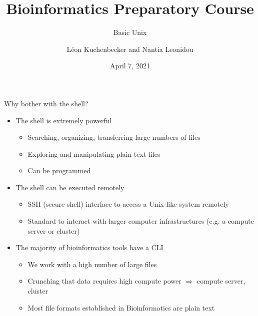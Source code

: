 \documentclass[aspectratio=1610]{beamer}
\title{Bioinformatics Preparatory Course}
\subtitle{Basic Unix}
\author{Léon Kuchenbecker and Nantia Leonidou}
\date{April 7, 2021}
\begin{document}

\begin{frame}
    \titlepage
\end{frame}



\begin{frame}[c]{Why bother with the shell?}
    \begin{itemize}[<+->]\setlength\itemsep{1em}
        \item The shell is extremely powerful

            \begin{itemize}[<.->]
                \item Searching, organizing, transferring large numbers of files
                \item Exploring and manipulating plain text files
                \item Can be programmed
            \end{itemize}

        \item The shell can be executed remotely

            \begin{itemize}[<.->]
                \item SSH (secure shell) interface to access a Unix-like system remotely
                \item Standard to interact with larger computer infrastructures (e.g. a compute
                    server or cluster)
            \end{itemize}

        \item The majority of bioinformatics tools have a CLI
            \begin{itemize}[<.->]
                \item We work with a high number of large files
                \item Crunching that data requires high compute power $\Rightarrow$ compute server,
                    cluster
                \item Most file formats established in Bioinformatics are plain text
            \end{itemize}
    \end{itemize}
\end{frame}
\end{document}
